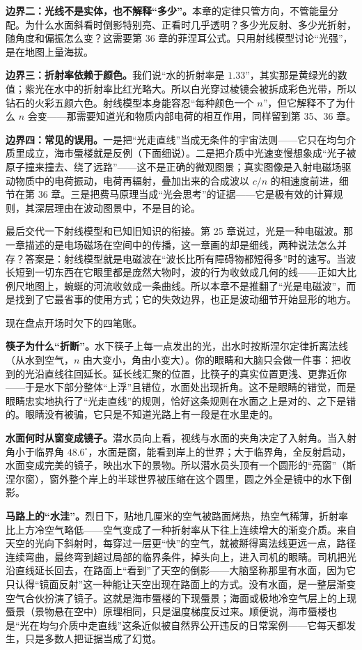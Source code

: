 \textbf{边界二：光线不是实体，也不解释“多少”。}本章的定律只管方向，不管能量分配。为什么水面斜看时倒影特别亮、正看时几乎透明？多少光反射、多少光折射，随角度和偏振怎么变？这需要第 36 章的菲涅耳公式。只用射线模型讨论“光强”，是在地图上量海拔。

\textbf{边界三：折射率依赖于颜色。}我们说“水的折射率是 \(1.33\)”，其实那是黄绿光的数值；紫光在水中的折射率比红光略大。所以白光穿过棱镜会被拆成彩色光带，所以钻石的火彩五颜六色。射线模型本身能容忍“每种颜色一个 \(n\)”，但它解释不了为什么 \(n\) 会变——那需要知道光和物质内部电荷的相互作用，同样留到第 35、36 章。

\textbf{边界四：常见的误用。}一是把“光走直线”当成无条件的宇宙法则——它只在均匀介质里成立，海市蜃楼就是反例（下面细说）。二是把介质中光速变慢想象成“光子被原子撞来撞去、绕了远路”——这不是正确的微观图景；真实图像是入射电磁场驱动物质中的电荷振动，电荷再辐射，叠加出来的合成波以 \(c/n\) 的相速度前进，细节在第 36 章。三是把费马原理当成“光会思考”的证据——它是极有效的计算规则，其深层理由在波动图景中，不是目的论。

最后交代一下射线模型和已知旧知识的衔接。第 25 章说过，光是一种电磁波。那一章描述的是电场磁场在空间中的传播，这一章画的却是细线，两种说法怎么并存？答案是：射线模型就是电磁波在“波长比所有障碍物都短得多”时的速写。当波长短到一切东西在它眼里都是庞然大物时，波的行为收敛成几何的线——正如大比例尺地图上，蜿蜒的河流收敛成一条曲线。所以本章不是推翻了“光是电磁波”，而是找到了它最省事的使用方式；它的失效边界，也正是波动细节开始显形的地方。


现在盘点开场时欠下的四笔账。

\textbf{筷子为什么“折断”。}水下筷子上每一点发出的光，出水时按斯涅尔定律折离法线（从水到空气，\(n\) 由大变小，角由小变大）。你的眼睛和大脑只会做一件事：把收到的光沿直线往回延长。延长线汇聚的位置，比筷子的真实位置更浅、更靠近你——于是水下部分整体“上浮”且错位，水面处出现折角。这不是眼睛的错觉，而是眼睛忠实地执行了“光走直线”的规则，恰好这条规则在水面之上是对的、之下是错的。眼睛没有被骗，它只是不知道光路上有一段是在水里走的。

\textbf{水面何时从窗变成镜子。}潜水员向上看，视线与水面的夹角决定了入射角。当入射角小于临界角 \(48.6^\circ\)，水面是窗，能看到岸上的世界；大于临界角，全反射启动，水面变成完美的镜子，映出水下的景物。所以潜水员头顶有一个圆形的“亮窗”（斯涅尔窗），窗外整个岸上的半球世界被压缩在这个圆里，圆之外全是镜中的水下倒影。

\textbf{马路上的“水洼”。}烈日下，贴地几厘米的空气被路面烤热，热空气稀薄，折射率比上方冷空气略低——空气变成了一种折射率从下往上连续增大的渐变介质。来自天空的光向下斜射时，每穿过一层更“快”的空气，就被掰得离法线更远一点，路径连续弯曲，最终弯到超过局部的临界条件，掉头向上，进入司机的眼睛。司机把光沿直线延长回去，在路面上“看到”了天空的倒影——大脑坚称那里有水面，因为它只认得“镜面反射”这一种能让天空出现在路面上的方式。没有水面，是一整层渐变空气合伙扮演了镜子。这就是海市蜃楼的下现蜃景；海面或极地冷空气层上的上现蜃景（景物悬在空中）原理相同，只是温度梯度反过来。顺便说，海市蜃楼也是“光在均匀介质中走直线”这条近似被自然界公开违反的日常案例——它每天都发生，只是多数人把证据当成了幻觉。

